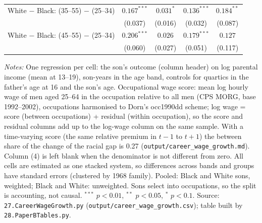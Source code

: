 \begin{table}[!htbp]
{{\begin{tabular}{lcccc}
White $-$ Black: (35--55) $-$ (25--34) & $0.167^{***}$ & $0.031^{*}$ & $0.136^{***}$ & $0.184^{**}$ \\
 & (0.037) & (0.016) & (0.032) & (0.087) \\
White $-$ Black: (45--55) $-$ (25--34) & $0.206^{***}$ & $0.026$ & $0.179^{***}$ & $0.127$ \\
 & (0.060) & (0.027) & (0.051) & (0.117) \\
\bottomrule
\end{tabular}}}
\par\smallskip
\begin{minipage}{\textwidth}\footnotesize \textit{Notes:} One regression per cell: the son's outcome (column header) on log parental income (mean at 13--19), son-years in the age band, controls for quartics in the father's age at 16 and the son's age. Occupational wage score: mean log hourly wage of men aged 25--64 in the occupation relative to all men (CPS MORG, base 1992--2002), occupations harmonised to Dorn's occ1990dd scheme; log wage = score (between occupations) + residual (within occupation), so the score and residual columns add up to the log-wage column on the same sample. With a time-varying score (the same relative premium in $t-1$ to $t+1$) the between share of the change of the racial gap is 0.27 (\texttt{output/career\_wage\_growth.md}). Column (4) is left blank when the denominator is not different from zero. All cells are estimated as one stacked system, so differences across bands and groups have standard errors (clustered by 1968 family). Pooled: Black and White sons, weighted; Black and White: unweighted. Sons select into occupations, so the split is accounting, not causal. $^{***}$ $p<0.01$, $^{**}$ $p<0.05$, $^{*}$ $p<0.1$. Source: \texttt{27.CareerWageGrowth.py} (\texttt{output/career\_wage\_growth.csv}); table built by \texttt{28.PaperBTables.py}.\end{minipage}
\end{table}
